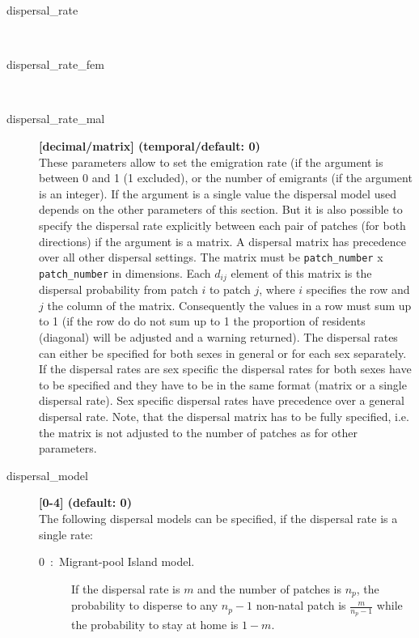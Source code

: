 \documentclass[letterpaper,12pt,oneside]{book}
\begin{document}
\begin{description}
\item[dispersal\_rate]\hspace*{\fill}\\
\vspace{-9mm}
\item[dispersal\_rate\_fem]\hspace*{\fill}\\
\vspace{-9mm}
\item[dispersal\_rate\_mal]\textbf{[decimal/matrix] (temporal/default: 0)}\\
These parameters allow to set the emigration rate (if the argument is between 0 and 1 (1 excluded), or the number of emigrants (if the argument is an integer). If the argument is a single value the dispersal model used depends on the other parameters of this section. But it is also possible to specify the dispersal rate explicitly between each pair of patches (for both directions) if the argument is a matrix. A dispersal matrix has precedence over all other dispersal settings. The matrix must be \texttt{patch\_number} x \texttt{patch\_number} in dimensions. Each $d_{ij}$ element of this matrix is the dispersal probability from patch $i$ to patch $j$, where $i$ specifies the row and $j$ the column of the matrix. Consequently the values in a row must sum up to 1 (if the row do do not sum up to 1 the proportion of residents (diagonal) will be adjusted and a warning returned). The dispersal rates can either be specified for both sexes in general or for each sex separately. If the dispersal rates are sex specific the dispersal rates for both sexes have to be specified and they have to be in the same format (matrix or a single dispersal rate). Sex specific dispersal rates have precedence over a general dispersal rate. Note, that the dispersal matrix has to be fully specified, i.e. the matrix is not adjusted to the number of patches as for other parameters. 

\item[dispersal\_model] \textbf{[0-4] (default: 0)}\\
The following dispersal models can be specified, if the dispersal rate is a single rate:
\begin{description}
\item[0~:~Migrant-pool Island model.] If the dispersal rate is $m$ and the number of patches is $n_{p}$, the probability to disperse to any $n_{p}-1$ non-natal patch is $\frac{m}{n_{p}-1}$ while the probability to stay at home is $1-m$.


\end{description}
\end{description}
\end{document}
